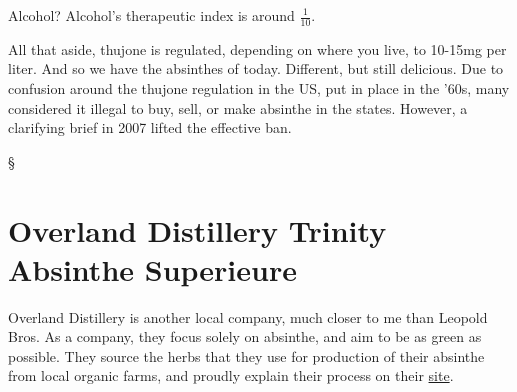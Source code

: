 \documentclass[12pt,letterpaper,oneside]{memoir}
\newcommand\secdiv{
  \begin{center}
    \S
  \end{center}
}
\begin{document}
  Alcohol?  Alcohol's therapeutic index is around $\frac{1}{10}$.

  All that aside, thujone is regulated, depending on where you live, to 10-15mg per liter.  And so we have the absinthes of today.  Different, but still delicious.  Due to confusion around the thujone regulation in the US, put in place in the '60s, many considered it illegal to buy, sell, or make absinthe in the states.  However, a clarifying brief in 2007 lifted the effective ban.

  \secdiv

  \section*{Overland Distillery Trinity Absinthe Superieure}


  Overland Distillery is another local company, much closer to me than Leopold Bros.  As a company, they focus solely on absinthe, and aim to be as green as possible.  They source the herbs that they use for production of their absinthe from local organic farms, and proudly explain their process on their \href{http://www.overlanddistillery.com/home/4577963004}{site}.
\end{document}
